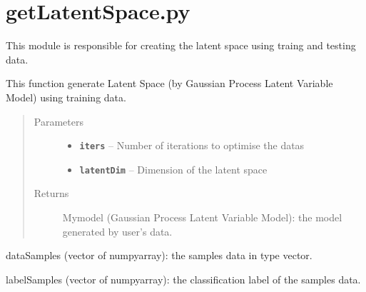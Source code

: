 \documentclass[letterpaper,10pt,english]{sphinxmanual}
\begin{document}
\section{getLatentSpace.py}
\label{Documentation of Code:getlatentspace-py}\label{Documentation of Code:module-getLatentSpace}
This module is responsible for creating the latent space using traing and testing data.

\begin{fulllineitems}
\label{Documentation of Code:getLatentSpace.genLatentSpace}
This function generate Latent Space (by Gaussian Process Latent Variable Model) using training data.
\begin{quote}\begin{description}
\item[{Parameters}] \leavevmode\begin{itemize}
\item {} 
\textbf{\texttt{iters}} -- Number of iterations to optimise the datas

\item {} 
\textbf{\texttt{latentDim}} -- Dimension of the latent space

\end{itemize}

\item[{Returns}] \leavevmode
Mymodel (Gaussian Process Latent Variable Model):  the model generated by user's data.

\end{description}\end{quote}

dataSamples (vector of numpyarray): the samples data in type vector.

labelSamples (vector of numpyarray): the classification label of the samples data.

\end{fulllineitems}

\end{document}
